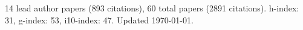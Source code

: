 14 lead author papers (893 citations),
60 total papers (2891 citations).\newline
h-index: 31, g-index: 53, i10-index: 47. Updated \today.